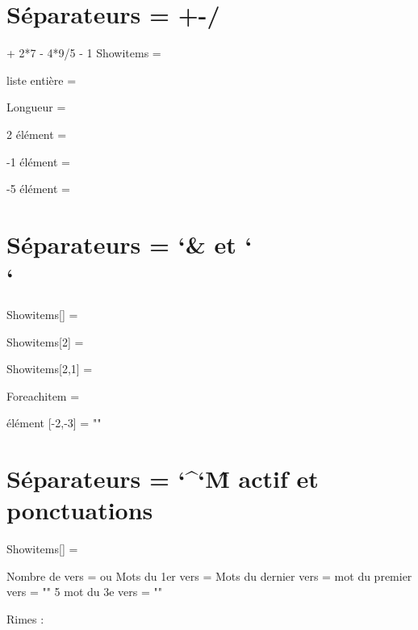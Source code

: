 \section{Séparateurs = +\quad -\quad *\quad /}
\setsepchar[.]{+||-||*||/}
\def\expression{3 + 2*7 - 4*9/5 - 1}
\readlist*\nombres\expression
Showitems = \showitems\nombres\par
liste entière = \nombres[]\par
Longueur = \nombreslen\par
2 élément = \nombres[2]\par
-1 élément = \nombres[-1]\par
-5 élément = \nombres[-5]

\section{Séparateurs = \char`\&{} et \char`\\\char `\\}
\setsepchar{\\/&}
\readlist{}
Showitems[] = \showitems*\foo\par
Showitems[2] = \showitems*\foo[2]\par
Showitems[2,1] = \showitems*\foo[2,1]\par%
Foreachitem = \foreachitem\myitem\in{}\par
élément [-2,-3] = "\foo[-2,-3]"\par

\section{Séparateurs = \char`\^\char`\^M actif et ponctuations}
\begingroup
\obeylines
\ignoreemptyitems
{}%
\readlist{}%
\begingroup%
\def\showitemsmacro#1{%
	\begingroup\fboxsep=0.25pt \fboxrule=0.5pt \fbox{\strut#1}\endgroup\par
}
Showitems[] =
\showitems\poeme
\endgroup%
\medbreak

Nombre de vers = \poemelen{} ou \listlen\poeme[]
Mots du 1er vers = \showitems\poeme[1]
Mots du dernier vers = \showitems{} mot du premier vers = "\poeme[1,4]"
5 mot du 3e vers = "\poeme[3,5]"
\medbreak

{\loitextfontbf Rimes} :
\foreachitem\vers\in{}
\endgroup
\bye